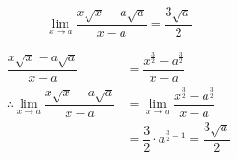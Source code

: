 \documentclass[14pt,fleqn]{extarticle}
\begin{document}
 

\begin{snippet}
    \correct

\[ \lim_{x\to a} \dfrac{x\sqrt{x} - a\sqrt{a}}{x-a} = \dfrac{3\sqrt{a}}{2}\]
    
    \reason
 
 \begin{align}
\dfrac{x\sqrt{x} - a\sqrt{a}}{x-a} &= \dfrac{x^{\frac{3}{2}} - a^{\frac{3}{2}}}{x-a} \\
\therefore \lim_{x\to a} \dfrac{x\sqrt{x} - a\sqrt{a}}{x-a} &= \lim_{x\to a}\dfrac{x^{\frac{3}{2}} - a^{\frac{3}{2}}}{x-a} \\
&= \dfrac{3}{2}\cdot a^{\frac{3}{2}-1} = \dfrac{3\sqrt{a}}{2}
\end{align}
   
\end{snippet} 
\end{document}
